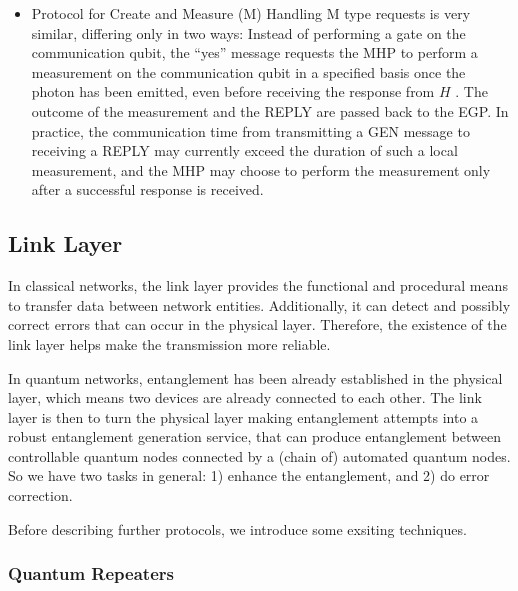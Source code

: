 \documentclass[10pt]{article}
\begin{document}
\begin{itemize}
    \item Protocol for Create and Measure (M)
    Handling M type requests is very similar, differing only in two ways:
    Instead of performing a gate on the communication qubit, the ``yes'' message requests the MHP to perform a measurement on the communication qubit in a specified basis once the photon has been emitted, even before receiving the response from $H$ . The outcome of the measurement and the REPLY are passed back to the EGP. In practice, the communication time from transmitting a GEN message to receiving a REPLY may currently exceed the duration of such a local measurement, and the MHP may choose to perform the measurement only after a successful response is received.



\end{itemize}


\subsection{Link Layer}

In classical networks, the link layer provides the functional and procedural means to transfer data between network entities. Additionally, it can detect and possibly correct errors that can occur in the physical layer. Therefore, the existence of the link layer helps make the transmission more reliable.


In quantum networks, entanglement has been already established in the physical layer, which means two devices are already connected to each other. The link layer is then to turn the physical layer making entanglement attempts into a robust entanglement generation service, that can produce entanglement between controllable quantum nodes connected by a (chain of) automated quantum nodes. So we have two tasks in general: 1) enhance the entanglement, and 2) do error correction.

Before describing further protocols, we introduce some exsiting techniques.

\subsubsection{Quantum Repeaters}
\end{document}

